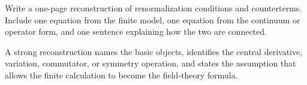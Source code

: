 \begin{exercise}
Write a one-page reconstruction of renormalization conditions and counterterms.  Include one equation from the finite model, one equation from the continuum or operator form, and one sentence explaining how the two are connected.
\begin{answer}
A strong reconstruction names the basic objects, identifies the central derivative, variation, commutator, or symmetry operation, and states the assumption that allows the finite calculation to become the field-theory formula.
\end{answer}
\end{exercise}
